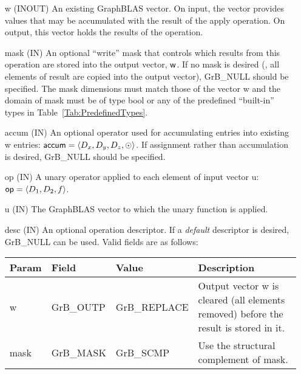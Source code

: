 \begin{itemize}[leftmargin=1in]
    \item[{\sf w}]    ({\sf INOUT}) An existing GraphBLAS vector.  On input,
    the vector provides values that may be accumulated with the result of the
    apply operation.  On output, this vector holds the results of the
    operation.

    \item[{\sf mask}]  ({\sf IN}) An optional ``write'' mask that controls which
    results from this operation are stored into the output vector,
    ${\sf w}$.  If no mask is desired (\ie, all elements
    of result are copied into the output vector), {\sf GrB\_NULL}
    should be specified. The mask dimensions must match those of the
    vector {\sf w} and the domain of {\sf mask} must be
    of type {\sf bool} or any of the predefined ``built-in'' types in
    Table~\ref{Tab:PredefinedTypes}.

    \item[{\sf accum}]    ({\sf IN}) An optional operator used for accumulating
    entries into existing {\sf w} entries: ${\sf accum} = \langle D_x,
    D_y, D_z,\odot \rangle$. If assignment rather than accumulation is
    desired, {\sf GrB\_NULL} should be specified.

    \item[{\sf op}]	({\sf IN}) A unary operator applied to 
	    each element of input vector {\sf u}: ${\sf op} = \langle D_1,D_2,f \rangle$.

    \item[{\sf u}]       ({\sf IN}) The GraphBLAS vector to which the unary function
    is applied.
    
    \item[{\sf desc}]     ({\sf IN}) An optional operation descriptor.  If a 
    \emph{default} descriptor is desired, {\sf GrB\_NULL} can be used.  Valid 
    fields are as follows: \\
    
    \begin{tabular}{lllp{2.5in}}
        Param & Field  & Value & Description \\
        \hline
        {\sf w}    & {\sf GrB\_OUTP} & {\sf GrB\_REPLACE} & Output vector {\sf w}
        is cleared (all elements removed) before the result is stored in it. \\
        
        {\sf mask} & {\sf GrB\_MASK} & {\sf GrB\_SCMP}   & Use the structural 
        complement of {\sf mask}. \\
    \end{tabular}
\end{itemize}

